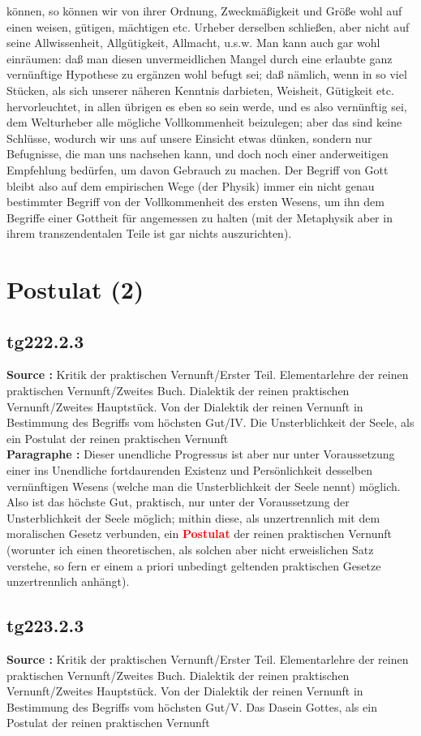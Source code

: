 \documentclass[a4paper,12pt,twoside]{book}
\newcommand{\match}[1]{\textcolor{red}{\textbf{#1}}}
\newcommand{\unnumberedsection}[1]{
	\section*{#1}
	\addcontentsline{toc}{section}{#1}
	\markright{#1}
}
\begin{document}
können, so können wir von ihrer Ordnung, Zweckmäßigkeit und Größe wohl auf einen weisen, gütigen, mächtigen etc. Urheber derselben schließen, aber nicht auf seine Allwissenheit, Allgütigkeit, Allmacht, u.s.w. Man kann auch gar wohl einräumen: daß man diesen unvermeidlichen Mangel durch eine erlaubte ganz vernünftige Hypothese zu ergänzen wohl befugt sei; daß nämlich, wenn in so viel Stücken, als sich unserer näheren Kenntnis darbieten, Weisheit, Gütigkeit etc. hervorleuchtet, in allen übrigen es eben so sein werde, und es also vernünftig sei, dem Welturheber alle mögliche Vollkommenheit beizulegen; aber das sind keine Schlüsse, wodurch wir uns auf unsere Einsicht etwas dünken, sondern nur Befugnisse, die man uns nachsehen kann, und doch noch einer anderweitigen Empfehlung bedürfen, um davon Gebrauch zu machen. Der Begriff von Gott bleibt also auf dem empirischen Wege (der Physik) immer ein nicht genau bestimmter Begriff von der Vollkommenheit des ersten Wesens, um ihn dem Begriffe einer Gottheit für angemessen zu halten (mit der Metaphysik aber in ihrem transzendentalen Teile ist gar nichts auszurichten). 
	
	\unnumberedsection{Postulat (2)} 
	\subsection*{tg222.2.3} 
	\textbf{Source : }Kritik der praktischen Vernunft/Erster Teil. Elementarlehre der reinen praktischen Vernunft/Zweites Buch. Dialektik der reinen praktischen Vernunft/Zweites Hauptstück. Von der Dialektik der reinen Vernunft in Bestimmung des Begriffs vom höchsten Gut/IV. Die Unsterblichkeit der Seele, als ein Postulat der reinen praktischen Vernunft\\  
	
	\noindent\textbf{Paragraphe : }Dieser unendliche Progressus ist aber nur unter Voraussetzung einer ins Unendliche fortdaurenden Existenz und Persönlichkeit desselben vernünftigen Wesens (welche man die Unsterblichkeit der Seele nennt) möglich. Also ist das höchste Gut, praktisch, nur unter der Voraussetzung der Unsterblichkeit der Seele möglich; mithin diese, als unzertrennlich mit dem moralischen Gesetz verbunden, ein \match{Postulat} der reinen praktischen Vernunft (worunter ich  einen theoretischen, als solchen aber nicht erweislichen Satz verstehe, so fern er einem a priori unbedingt geltenden praktischen Gesetze unzertrennlich anhängt). 
	
	\subsection*{tg223.2.3} 
	\textbf{Source : }Kritik der praktischen Vernunft/Erster Teil. Elementarlehre der reinen praktischen Vernunft/Zweites Buch. Dialektik der reinen praktischen Vernunft/Zweites Hauptstück. Von der Dialektik der reinen Vernunft in Bestimmung des Begriffs vom höchsten Gut/V. Das Dasein Gottes, als ein Postulat der reinen praktischen Vernunft\\  
	
\end{document}
